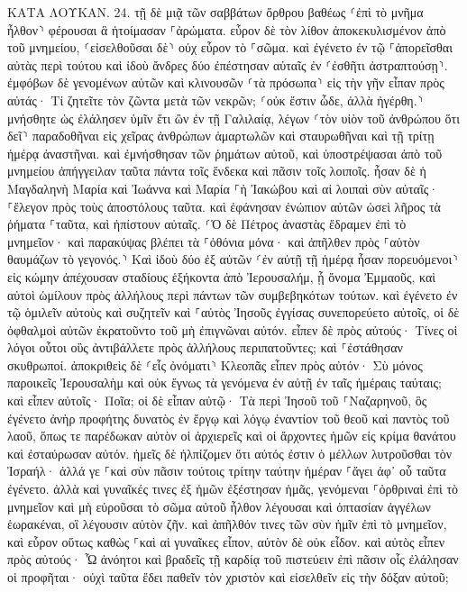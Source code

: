 \documentclass[twoside, 9pt]{extreport}
\begin{document}
ΚΑΤΑ ΛΟΥΚΑΝ.
24.
τῇ δὲ μιᾷ τῶν σαββάτων ὄρθρου βαθέως ⸂ἐπὶ τὸ μνῆμα ἦλθον⸃ φέρουσαι ἃ ἡτοίμασαν ⸀ἀρώματα. 
εὗρον δὲ τὸν λίθον ἀποκεκυλισμένον ἀπὸ τοῦ μνημείου, 
⸂εἰσελθοῦσαι δὲ⸃ οὐχ εὗρον τὸ ⸀σῶμα. 
καὶ ἐγένετο ἐν τῷ ⸀ἀπορεῖσθαι αὐτὰς περὶ τούτου καὶ ἰδοὺ ἄνδρες δύο ἐπέστησαν αὐταῖς ἐν ⸂ἐσθῆτι ἀστραπτούσῃ⸃. 
ἐμφόβων δὲ γενομένων αὐτῶν καὶ κλινουσῶν ⸂τὰ πρόσωπα⸃ εἰς τὴν γῆν εἶπαν πρὸς αὐτάς· Τί ζητεῖτε τὸν ζῶντα μετὰ τῶν νεκρῶν; 
⸂οὐκ ἔστιν ὧδε, ἀλλὰ ἠγέρθη.⸃ μνήσθητε ὡς ἐλάλησεν ὑμῖν ἔτι ὢν ἐν τῇ Γαλιλαίᾳ, 
λέγων ⸂τὸν υἱὸν τοῦ ἀνθρώπου ὅτι δεῖ⸃ παραδοθῆναι εἰς χεῖρας ἀνθρώπων ἁμαρτωλῶν καὶ σταυρωθῆναι καὶ τῇ τρίτῃ ἡμέρᾳ ἀναστῆναι. 
καὶ ἐμνήσθησαν τῶν ῥημάτων αὐτοῦ, 
καὶ ὑποστρέψασαι ἀπὸ τοῦ μνημείου ἀπήγγειλαν ταῦτα πάντα τοῖς ἕνδεκα καὶ πᾶσιν τοῖς λοιποῖς. 
ἦσαν δὲ ἡ Μαγδαληνὴ Μαρία καὶ Ἰωάννα καὶ Μαρία ⸀ἡ Ἰακώβου καὶ αἱ λοιπαὶ σὺν αὐταῖς· ⸀ἔλεγον πρὸς τοὺς ἀποστόλους ταῦτα. 
καὶ ἐφάνησαν ἐνώπιον αὐτῶν ὡσεὶ λῆρος τὰ ῥήματα ⸀ταῦτα, καὶ ἠπίστουν αὐταῖς. 
⸂Ὁ δὲ Πέτρος ἀναστὰς ἔδραμεν ἐπὶ τὸ μνημεῖον· καὶ παρακύψας βλέπει τὰ ⸀ὀθόνια μόνα· καὶ ἀπῆλθεν πρὸς ⸀αὑτὸν θαυμάζων τὸ γεγονός.⸃ 
Καὶ ἰδοὺ δύο ἐξ αὐτῶν ⸂ἐν αὐτῇ τῇ ἡμέρᾳ ἦσαν πορευόμενοι⸃ εἰς κώμην ἀπέχουσαν σταδίους ἑξήκοντα ἀπὸ Ἰερουσαλήμ, ᾗ ὄνομα Ἐμμαοῦς, 
καὶ αὐτοὶ ὡμίλουν πρὸς ἀλλήλους περὶ πάντων τῶν συμβεβηκότων τούτων. 
καὶ ἐγένετο ἐν τῷ ὁμιλεῖν αὐτοὺς καὶ συζητεῖν καὶ ⸀αὐτὸς Ἰησοῦς ἐγγίσας συνεπορεύετο αὐτοῖς, 
οἱ δὲ ὀφθαλμοὶ αὐτῶν ἐκρατοῦντο τοῦ μὴ ἐπιγνῶναι αὐτόν. 
εἶπεν δὲ πρὸς αὐτούς· Τίνες οἱ λόγοι οὗτοι οὓς ἀντιβάλλετε πρὸς ἀλλήλους περιπατοῦντες; καὶ ⸀ἐστάθησαν σκυθρωποί. 
ἀποκριθεὶς δὲ ⸂εἷς ὀνόματι⸃ Κλεοπᾶς εἶπεν πρὸς αὐτόν· Σὺ μόνος παροικεῖς Ἰερουσαλὴμ καὶ οὐκ ἔγνως τὰ γενόμενα ἐν αὐτῇ ἐν ταῖς ἡμέραις ταύταις; 
καὶ εἶπεν αὐτοῖς· Ποῖα; οἱ δὲ εἶπαν αὐτῷ· Τὰ περὶ Ἰησοῦ τοῦ ⸀Ναζαρηνοῦ, ὃς ἐγένετο ἀνὴρ προφήτης δυνατὸς ἐν ἔργῳ καὶ λόγῳ ἐναντίον τοῦ θεοῦ καὶ παντὸς τοῦ λαοῦ, 
ὅπως τε παρέδωκαν αὐτὸν οἱ ἀρχιερεῖς καὶ οἱ ἄρχοντες ἡμῶν εἰς κρίμα θανάτου καὶ ἐσταύρωσαν αὐτόν. 
ἡμεῖς δὲ ἠλπίζομεν ὅτι αὐτός ἐστιν ὁ μέλλων λυτροῦσθαι τὸν Ἰσραήλ· ἀλλά γε ⸀καὶ σὺν πᾶσιν τούτοις τρίτην ταύτην ἡμέραν ⸀ἄγει ἀφ᾽ οὗ ταῦτα ἐγένετο. 
ἀλλὰ καὶ γυναῖκές τινες ἐξ ἡμῶν ἐξέστησαν ἡμᾶς, γενόμεναι ⸀ὀρθριναὶ ἐπὶ τὸ μνημεῖον 
καὶ μὴ εὑροῦσαι τὸ σῶμα αὐτοῦ ἦλθον λέγουσαι καὶ ὀπτασίαν ἀγγέλων ἑωρακέναι, οἳ λέγουσιν αὐτὸν ζῆν. 
καὶ ἀπῆλθόν τινες τῶν σὺν ἡμῖν ἐπὶ τὸ μνημεῖον, καὶ εὗρον οὕτως καθὼς ⸀καὶ αἱ γυναῖκες εἶπον, αὐτὸν δὲ οὐκ εἶδον. 
καὶ αὐτὸς εἶπεν πρὸς αὐτούς· Ὦ ἀνόητοι καὶ βραδεῖς τῇ καρδίᾳ τοῦ πιστεύειν ἐπὶ πᾶσιν οἷς ἐλάλησαν οἱ προφῆται· 
οὐχὶ ταῦτα ἔδει παθεῖν τὸν χριστὸν καὶ εἰσελθεῖν εἰς τὴν δόξαν αὐτοῦ; 
\end{document}
